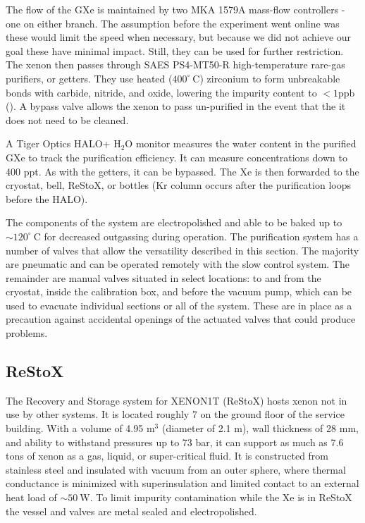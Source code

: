 The flow of the GXe is maintained by two MKA 1579A mass-flow controllers - one on either branch.  The assumption before the experiment went
online was these would limit the speed when necessary, but because we did not achieve our goal these have minimal impact.  Still, they can
be used for further restriction.  The xenon then passes through SAES PS4-MT50-R high-temperature rare-gas purifiers, or getters.  They
use heated ($400^{\circ}\ \mathrm{C}$) zirconium to form unbreakable bonds with carbide, nitride, and oxide, lowering the impurity content
to $< 1 \mathrm{ppb}$ ().  A bypass valve allows the xenon to pass un-purified in the event that the it does not need
to be cleaned.

A Tiger Optics HALO+ H$_2$O monitor measures the water content in the purified GXe to track the purification efficiency.  It can measure
concentrations down to 400 ppt.  As with the getters, it can be bypassed.  The Xe is then forwarded to the cryostat, bell, ReStoX, or
bottles (Kr column occurs after the purification loops before the HALO).

The components of the system are electropolished and able to be baked up to ${\sim} 120^{\circ}\ \mathrm{C}$ for decreased outgassing during
operation.  The purification system has a number of valves that allow the versatility described in this section.  The majority are pneumatic and can
be operated remotely with the slow control system.  The remainder are manual valves situated in select locations: to and from the cryostat,
inside the calibration box, and before the vacuum pump, which can be used to evacuate individual sections or all of the system.  These are
in place as a precaution against accidental openings of the actuated valves that could produce problems.


\subsection{ReStoX}
\label{subsec:xenon1t_restox}
The Recovery and Storage system for XENON1T (ReStoX) hosts xenon not in use by other systems.  It is located roughly 7 on the ground floor of the
service building.  With a volume of 4.95 m$^{3}$
(diameter of 2.1 m), wall thickness of 28 mm, and ability to withstand pressures up to 73 bar, it can support as much as 7.6 tons of xenon
as a gas, liquid, or super-critical fluid.  It is constructed from stainless steel and insulated with vacuum from an outer sphere, where
thermal conductance is minimized with superinsulation and limited contact to an external heat load of ${\sim}50\ \mathrm{W}$.  To limit
impurity contamination while the Xe is in ReStoX the vessel and valves are metal sealed and electropolished.

